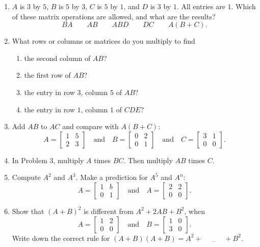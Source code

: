 \documentclass[14pt, a4paper]{article}
\begin{document}
\begin{enumerate}
    \item $A$ is $3$ by $5$, $B$ is $5$ by $3$, $C$ is $5$ by $1$, and $D$ is $3$ by $1$. All entries are $1$. Which of these matrix operations are allowed, and what are the results?
          \[
              BA \qquad AB \qquad ABD \qquad DC \qquad A(B+C).
          \]

    \item What rows or columns or matrices do you multiply to find
          \begin{enumerate}
              \item the second column of $AB$?
              \item the first row of $AB$?
              \item the entry in row $3$, column $5$ of $AB$?
              \item the entry in row $1$, column $1$ of $CDE$?
          \end{enumerate}

    \item Add $AB$ to $AC$ and compare with $A(B+C)$:
          \[
              A = \begin{bmatrix} 1 & 5 \\ 2 & 3 \end{bmatrix}
              \quad\text{and}\quad
              B = \begin{bmatrix} 0 & 2 \\ 0 & 1 \end{bmatrix}
              \quad\text{and}\quad
              C = \begin{bmatrix} 3 & 1 \\ 0 & 0 \end{bmatrix}.
          \]

    \item In Problem 3, multiply $A$ times $BC$. Then multiply $AB$ times $C$.

    \item Compute $A^2$ and $A^3$. Make a prediction for $A^5$ and $A^n$:
          \[
              A = \begin{bmatrix} 1 & b \\ 0 & 1 \end{bmatrix}
              \quad\text{and}\quad
              A = \begin{bmatrix} 2 & 2 \\ 0 & 0 \end{bmatrix}.
          \]

    \item Show that $(A+B)^2$ is different from $A^2 + 2AB + B^2$, when
          \[
              A = \begin{bmatrix} 1 & 2 \\ 0 & 0 \end{bmatrix}
              \quad\text{and}\quad
              B = \begin{bmatrix} 1 & 0 \\ 3 & 0 \end{bmatrix}.
          \]
          Write down the correct rule for $(A+B)(A+B) = A^2 + \underline{\hspace{3em}} + B^2$.


\end{enumerate}
\end{document}
